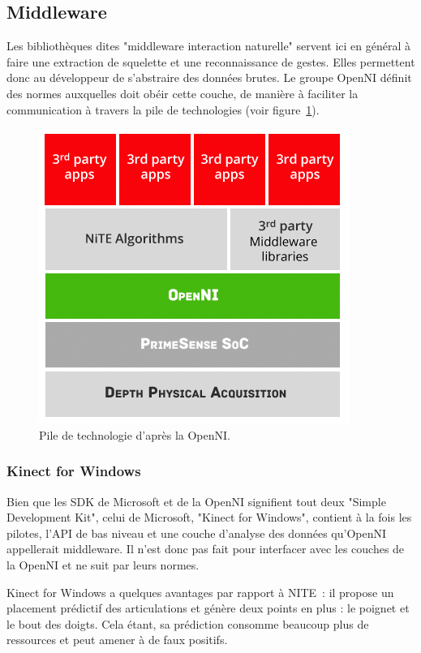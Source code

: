 
\subsection{Middleware}
Les bibliothèques dites "middleware interaction naturelle" servent ici en 
général à faire une 
extraction de squelette et une reconnaissance de gestes. Elles permettent donc 
au développeur de s'abstraire des données brutes. Le groupe OpenNI définit 
des normes auxquelles doit obéir cette couche, de 
manière à faciliter la communication à travers la pile de technologies (voir 
figure~\ref{fig:openni_technology_stack}).
\begin{figure}[h!]
\centering
\includegraphics[width=0.7\linewidth]{../images/openni_technology_stack}
\caption{Pile de technologie d'après la OpenNI.}
\label{fig:openni_technology_stack}
\end{figure}


\subsubsection{Kinect for Windows}  
Bien que les SDK de Microsoft et de la OpenNI signifient tout deux 
"Simple Development Kit",
celui de Microsoft, "Kinect for Windows", contient à la fois les pilotes, 
l'API de bas niveau et une couche d'analyse des données qu'OpenNI appellerait 
middleware. Il n'est donc pas fait pour interfacer avec les couches de la 
OpenNI et ne suit par leurs normes.

Kinect for Windows a quelques avantages par rapport à NITE~: il propose un
placement prédictif des articulations et génère deux points en plus :
le poignet et le bout des doigts. Cela étant, sa prédiction consomme beaucoup 
plus de ressources et peut amener à de faux positifs\cite{microsoft_vs_openni}.

